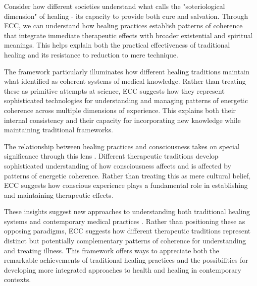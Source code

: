 Consider how different societies understand what \cite{good1994medicine} calls the "soteriological dimension" of healing - its capacity to provide both cure and salvation. Through ECC, we can understand how healing practices establish patterns of coherence that integrate immediate therapeutic effects with broader existential and spiritual meanings. This helps explain both the practical effectiveness of traditional healing and its resistance to reduction to mere technique.

The framework particularly illuminates how different healing traditions maintain what \cite{leslie1976asian} identified as coherent systems of medical knowledge. Rather than treating these as primitive attempts at science, ECC suggests how they represent sophisticated technologies for understanding and managing patterns of energetic coherence across multiple dimensions of experience. This explains both their internal consistency and their capacity for incorporating new knowledge while maintaining traditional frameworks.

The relationship between healing practices and consciousness takes on special significance through this lens \cite{csordas1993somatic}. Different therapeutic traditions develop sophisticated understanding of how consciousness affects and is affected by patterns of energetic coherence. Rather than treating this as mere cultural belief, ECC suggests how conscious experience plays a fundamental role in establishing and maintaining therapeutic effects.

These insights suggest new approaches to understanding both traditional healing systems and contemporary medical practices \cite{kleinman1980patients}. Rather than positioning these as opposing paradigms, ECC suggests how different therapeutic traditions represent distinct but potentially complementary patterns of coherence for understanding and treating illness. This framework offers ways to appreciate both the remarkable achievements of traditional healing practices and the possibilities for developing more integrated approaches to health and healing in contemporary contexts.